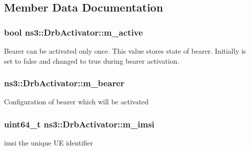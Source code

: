 \subsection{Member Data Documentation}
\subsubsection[{\texorpdfstring{m\+\_\+active}{m_active}}]{\setlength{\rightskip}{0pt plus 5cm}bool ns3\+::\+Drb\+Activator\+::m\+\_\+active\hspace{0.3cm}{\ttfamily [private]}}\hypertarget{classns3_1_1DrbActivator_ae43059256ef63105b760dc715dafa4cf}{}\label{classns3_1_1DrbActivator_ae43059256ef63105b760dc715dafa4cf}
Bearer can be activated only once. This value stores state of bearer. Initially is set to false and changed to true during bearer activation. 
\subsubsection[{\texorpdfstring{m\+\_\+bearer}{m_bearer}}]{ ns3\+::\+Drb\+Activator\+::m\+\_\+bearer\hspace{0.3cm}{\ttfamily [private]}}\hypertarget{classns3_1_1DrbActivator_a2ff495714c871e28e112fa5d4d8efb53}{}\label{classns3_1_1DrbActivator_a2ff495714c871e28e112fa5d4d8efb53}
Configuration of bearer which will be activated 
\subsubsection[{\texorpdfstring{m\+\_\+imsi}{m_imsi}}]{\setlength{\rightskip}{0pt plus 5cm}uint64\+\_\+t ns3\+::\+Drb\+Activator\+::m\+\_\+imsi\hspace{0.3cm}{\ttfamily [private]}}\hypertarget{classns3_1_1DrbActivator_a409d601e99df7e2c18fb827115e52695}{}\label{classns3_1_1DrbActivator_a409d601e99df7e2c18fb827115e52695}
imsi the unique UE identifier 
